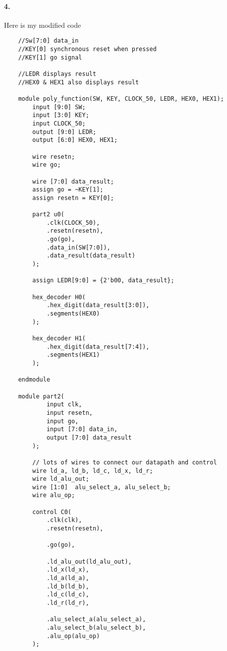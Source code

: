 \documentclass{article}
\begin{document}
\paragraph{4.} Here is my modified code
\begin{verbatim}
    //Sw[7:0] data_in
    //KEY[0] synchronous reset when pressed
    //KEY[1] go signal

    //LEDR displays result
    //HEX0 & HEX1 also displays result

    module poly_function(SW, KEY, CLOCK_50, LEDR, HEX0, HEX1);
        input [9:0] SW;
        input [3:0] KEY;
        input CLOCK_50;
        output [9:0] LEDR;
        output [6:0] HEX0, HEX1;

        wire resetn;
        wire go;

        wire [7:0] data_result;
        assign go = ~KEY[1];
        assign resetn = KEY[0];

        part2 u0(
            .clk(CLOCK_50),
            .resetn(resetn),
            .go(go),
            .data_in(SW[7:0]),
            .data_result(data_result)
        );
        
        assign LEDR[9:0] = {2'b00, data_result};

        hex_decoder H0(
            .hex_digit(data_result[3:0]), 
            .segments(HEX0)
        );
            
        hex_decoder H1(
            .hex_digit(data_result[7:4]), 
            .segments(HEX1)
        );

    endmodule

    module part2(
            input clk,
            input resetn,
            input go,
            input [7:0] data_in,
            output [7:0] data_result
        );

        // lots of wires to connect our datapath and control
        wire ld_a, ld_b, ld_c, ld_x, ld_r;
        wire ld_alu_out;
        wire [1:0]  alu_select_a, alu_select_b;
        wire alu_op;

        control C0(
            .clk(clk),
            .resetn(resetn),
            
            .go(go),
            
            .ld_alu_out(ld_alu_out), 
            .ld_x(ld_x),
            .ld_a(ld_a),
            .ld_b(ld_b),
            .ld_c(ld_c), 
            .ld_r(ld_r), 
            
            .alu_select_a(alu_select_a),
            .alu_select_b(alu_select_b),
            .alu_op(alu_op)
        );


\end{verbatim}
\end{document}
